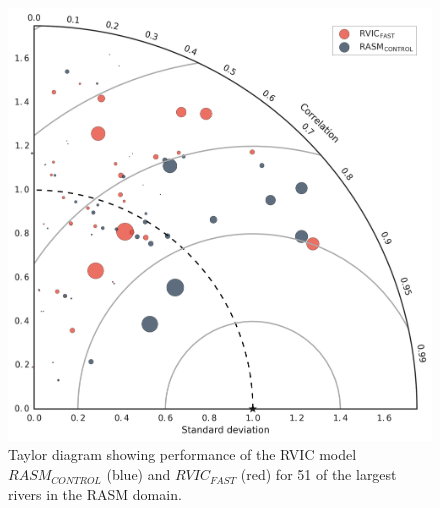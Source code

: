 \documentclass[jgrga, draft]{agutex}
\begin{document}
\clearpage
\begin{figure}
\noindent\includegraphics[width=40pc,natwidth=1]{R1010RBRbaaa01a_rvicfast_taylordiag}
\caption{Taylor diagram showing performance of the RVIC model $RASM_{CONTROL}$ (blue) and $RVIC_{FAST}$ (red) for 51 of the largest rivers in the RASM domain.}
\label{fig:taylor}
\end{figure}
\end{document}
